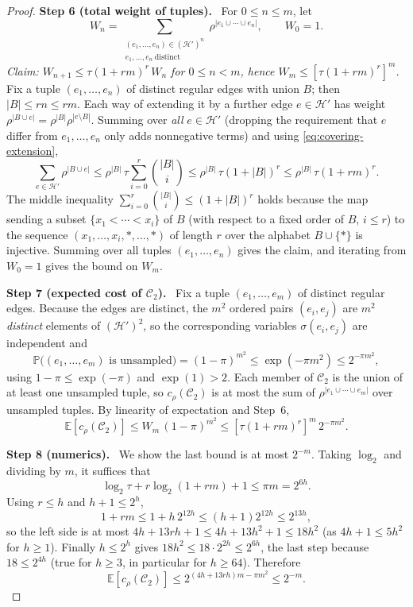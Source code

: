\documentclass[11pt,letterpaper]{article}
\theoremstyle{definition}
\theoremstyle{remark}
\numberwithin{equation}{section}
\newcommand{\step}[1]{\par\medskip\noindent\textbf{#1}\ }
\begin{document}
\begin{proof}
\step{Step 6 (total weight of tuples).}
For \(0\le n\le m\), let
\[
W_n=
\sum_{\substack{(e_1,\ldots,e_n)\in(\mathcal H')^n\\
                e_1,\ldots,e_n\ \text{distinct}}}
  \rho^{|e_1\cup\cdots\cup e_n|},
\qquad W_0=1.
\]
\emph{Claim: $W_{n+1}\le \tau(1+rm)^r\,W_n$ for $0\le n<m$, hence
$W_m\le[\tau(1+rm)^r]^m$.}
Fix a tuple $(e_1,\ldots,e_n)$ of distinct regular edges with union $B$;
then $|B|\le rn\le rm$. Each way of extending it by a further edge
$e\in\mathcal H'$ has weight
$\rho^{|B\cup e|}=\rho^{|B|}\rho^{|e\setminus B|}$. Summing over
\emph{all} $e\in\mathcal H'$ (dropping the requirement that $e$ differ from
$e_1,\ldots,e_n$ only adds nonnegative terms) and using
\eqref{eq:covering-extension},
\[
\sum_{e\in\mathcal H'}\rho^{|B\cup e|}
\le\rho^{|B|}\,\tau\sum_{i=0}^r\binom{|B|}{i}
\le\rho^{|B|}\,\tau(1+|B|)^r
\le\rho^{|B|}\,\tau(1+rm)^r .
\]
The middle inequality $\sum_{i=0}^r\binom{|B|}{i}\le(1+|B|)^r$ holds
because the map sending a subset $\{x_1<\cdots<x_i\}$ of $B$ (with respect
to a fixed order of $B$, $i\le r$) to the sequence
$(x_1,\ldots,x_i,\ast,\ldots,\ast)$ of length $r$ over the alphabet
$B\cup\{\ast\}$ is injective. Summing over all tuples $(e_1,\ldots,e_n)$
gives the claim, and iterating from $W_0=1$ gives the bound on $W_m$.

\step{Step 7 (expected cost of $\mathcal C_2$).}
Fix a tuple $(e_1,\ldots,e_m)$ of distinct regular edges. Because the
edges are distinct, the $m^2$ ordered pairs $(e_i,e_j)$ are $m^2$
\emph{distinct} elements of $(\mathcal H')^2$, so the corresponding
variables $\sigma(e_i,e_j)$ are independent and
\[
\mathbb P\bigl((e_1,\ldots,e_m)\text{ is unsampled}\bigr)
=(1-\pi)^{m^2}\le\exp(-\pi m^2)\le2^{-\pi m^2},
\]
using $1-\pi\le\exp(-\pi)$ and $\exp(1)>2$. Each member of $\mathcal C_2$
is the union of at least one unsampled tuple, so $c_\rho(\mathcal C_2)$ is
at most the sum of $\rho^{|e_1\cup\cdots\cup e_m|}$ over unsampled tuples.
By linearity of expectation and Step~6,
\[
\mathbb E[c_\rho(\mathcal C_2)]
\le W_m\,(1-\pi)^{m^2}
\le[\tau(1+rm)^r]^m\,2^{-\pi m^2}.
\]

\step{Step 8 (numerics).}
We show the last bound is at most $2^{-m}$. Taking $\log_2$ and dividing by
$m$, it suffices that
\[
\log_2 \tau+r\log_2(1+rm)+1\le\pi m=2^{6h}.
\]
Using $r\le h$ and $h+1\le2^h$,
\[
1+rm\le1+h\,2^{12h}\le(h+1)2^{12h}\le2^{13h},
\]
so the left side is at most $4h+13rh+1\le4h+13h^2+1\le18h^2$ (as
$4h+1\le5h^2$ for $h\ge1$). Finally $h\le 2^h$ gives
$18h^2\le18\cdot2^{2h}\le2^{6h}$, the last step because $18\le2^{4h}$
(true for $h\ge3$, in particular for $h\ge64$). Therefore
\begin{equation}\label{eq:covering-residual-cost}
\mathbb E[c_\rho(\mathcal C_2)]
\le2^{(4h+13rh)m-\pi m^2}\le2^{-m}.
\end{equation}


\end{proof}
\end{document}
